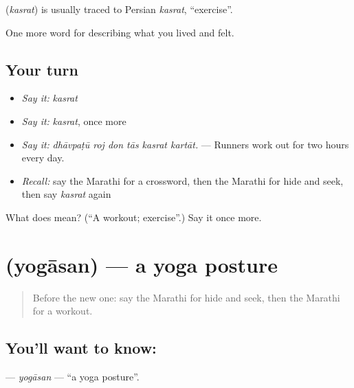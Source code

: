 \begin{cousinweb}
\textbf{} (\emph{kasrat}) is usually traced to Persian \emph{kasrat}, \textquotedblleft{}exercise\textquotedblright{}.
\end{cousinweb}

\begin{grammarlens}[title={What you've built}]
One more word for describing what you lived and felt.
\end{grammarlens}

\subsection*{Your turn}
\begin{itemize}
\raggedright
  \item \emph{Say it:} \emph{kasrat}
  \item \emph{Say it:} \emph{kasrat}, once more
  \item \emph{Say it:} \emph{dhāvpaṭū roj don tās kasrat kartāt.} — Runners work out for two hours every day.
  \item \emph{Recall:} say the Marathi for a crossword, then the Marathi for hide and seek, then say \emph{kasrat} again
\end{itemize}

\begin{tcolorbox}[breakable,colback=teal!4,colframe=teal!35!black,title={Before you move on}]
What does  mean? (\textquotedblleft{}A workout; exercise\textquotedblright{}.) Say it once more.
\end{tcolorbox}
\section[\texorpdfstring{\mr{योगासन} (yogāsan)}{योगासन (yogāsan)}]{ (yogāsan) — a yoga posture}

\label{lesson:MR-C533-yogasan}



\begin{quote}
Before the new one: say the Marathi for hide and seek, then the Marathi for a workout.
\end{quote}

\subsection*{You'll want to know: }
\textbf{} — \emph{yogāsan} — \textquotedblleft{}a yoga posture\textquotedblright{}.

